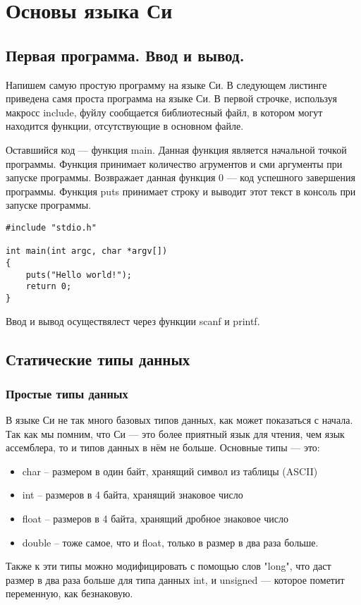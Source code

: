 \documentclass{bmstu}
\begin{document}
\chapter{Основы языка Си}
\section{Первая программа. Ввод и вывод.}

Напишем самую простую программу на языке Си.
В следующем листинге приведена самя проста программа на языке Си.
В первой строчке, используя макросс include, фуйлу сообщается библиотесный файл, в котором могут находится функции, отсутствующие в основном файле.

Оставшийся код --- функция main. 
Данная функция является начальной точкой программы.
Функция принимает количество агрументов и сми аргументы при запуске программы.
Возвражает данная функция 0 --- код успешного завершения программы.
Функция puts принимает строку и выводит этот текст в консоль при запуске программы. 

\begin{lstlisting}
#include "stdio.h"

int main(int argc, char *argv[])
{
    puts("Hello world!");
    return 0;
}
\end{lstlisting}

Ввод и вывод осуществялест через функции scanf и printf.


\section{Статические типы данных}
\subsection{Простые типы данных}
В языке Си не так много базовых типов данных, как может показаться с начала. Так как мы помним, что Си --- это более приятный язык для чтения, чем язык ассемблера, то и типов данных в нём не больше. Основные типы --- это:
\begin{itemize}
\item char   -- размером в один байт, хранящий символ из таблицы (ASCII)
\item int    -- размеров в 4 байта, хранящий знаковое число
\item float  -- размеров в 4 байта, хранящий дробное знаковое число
\item double -- тоже самое, что и float, только в размер в два раза больше.
\end{itemize}
Также к эти типы можно модифицировать с помощью слов "long", что даст размер в два раза больше для типа данных int, и unsigned --- которое пометит переменную, как безнаковую.
\end{document}

